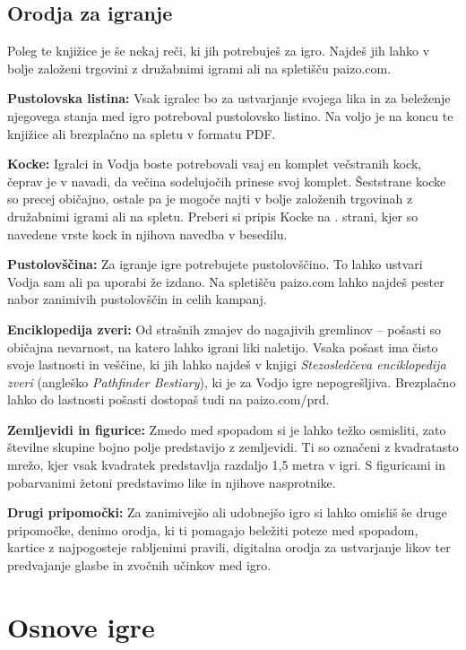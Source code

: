 \subsection{Orodja za igranje}

Poleg te knjižice je še nekaj reči, ki jih potrebuješ za igro. Najdeš jih lahko v bolje založeni trgovini z družabnimi igrami ali na spletišču paizo.com.

\textbf{Pustolovska listina:} Vsak igralec bo za ustvarjanje svojega lika in za beleženje njegovega stanja med igro potreboval pustolovsko listino. Na voljo je na koncu te knjižice ali brezplačno na spletu v formatu PDF.

\textbf{Kocke:} Igralci in Vodja boste potrebovali vsaj en komplet večstranih kock, čeprav je v navadi, da večina sodelujočih prinese svoj komplet. Šeststrane kocke so precej običajno, ostale pa je mogoče najti v bolje založenih trgovinah z družabnimi igrami ali na spletu. Preberi si pripis Kocke na \pageref{sidenote-kocke}. strani, kjer so navedene vrste kock in njihova navedba v besedilu.

\textbf{Pustolovščina:} Za igranje igre potrebujete pustolovščino. To lahko ustvari Vodja sam ali pa uporabi že izdano. Na spletišču paizo.com lahko najdeš pester nabor zanimivih pustolovščin in celih kampanj.

\textbf{Enciklopedija zveri:} Od strašnih zmajev do nagajivih gremlinov -- pošasti so običajna nevarnost, na katero lahko igrani liki naletijo. Vsaka pošast ima čisto svoje lastnosti in veščine, ki jih lahko najdeš v knjigi \textit{Stezosledčeva enciklopedija zveri} (angleško \textit{Pathfinder Bestiary}), ki je za Vodjo igre nepogrešljiva. Brezplačno lahko do lastnosti pošasti dostopaš tudi na paizo.com/prd.

\textbf{Zemljevidi in figurice:} Zmedo med spopadom si je lahko težko osmisliti, zato številne skupine bojno polje predstavijo z zemljevidi. Ti so označeni z kvadratasto mrežo, kjer vsak kvadratek predstavlja razdaljo 1,5 metra v igri. S figuricami in pobarvanimi žetoni predstavimo like in njihove nasprotnike.

\textbf{Drugi pripomočki:} Za zanimivejšo ali udobnejšo igro si lahko omisliš še druge pripomočke, denimo orodja, ki ti pomagajo beležiti poteze med spopadom, kartice z najpogosteje rabljenimi pravili, digitalna orodja za ustvarjanje likov ter predvajanje glasbe in zvočnih učinkov med igro.

\section{Osnove igre}

